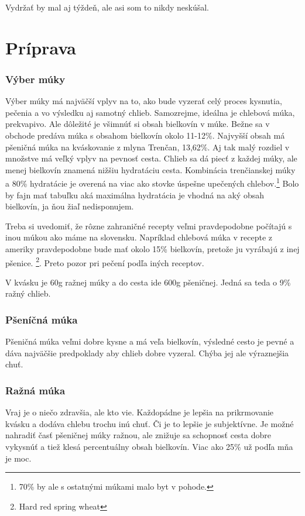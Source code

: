 \documentclass[a4paper,12pt]{article}
\begin{document}
Vydržať by mal aj týždeň, ale asi som to nikdy neskúšal.

\section{Príprava}

\subsubsection{Výber múky}
Výber múky má najväčší vplyv na to, ako bude vyzerať celý proces kysnutia, pečenia a vo výsledku aj samotný chlieb. Samozrejme, ideálna je chlebová múka, prekvapivo. Ale dôležité je všimnúť si obsah bielkovín v múke. Bežne sa v obchode predáva múka s obsahom bielkovín okolo 11-12\%. Najvyšší obsah má pšeničná múka na kváskovanie z mlyna Trenčan, 13,62\%. Aj tak malý rozdiel v množstve má veľký vplyv na pevnosť cesta. Chlieb sa dá piecť z každej múky, ale menej bielkovín znamená nižšiu hydratáciu cesta. Kombinácia trenčianskej múky a 80\% hydratácie je overená na viac ako stovke úspešne upečených chlebov.\footnote{70\% by ale s ostatnými múkami malo byt v pohode.} Bolo by fajn mať tabuľku aká maximálna hydratácia je vhodná na aký obsah bielkovín, ja ňou žiaľ nedisponujem.

Treba si uvedomiť, že rôzne zahraničné recepty veľmi pravdepodobne počítajú s inou múkou ako máme na slovensku. Napríklad chlebová múka v recepte z ameriky pravdepodobne bude mať okolo 15\% bielkovín, pretože ju vyrábajú z inej pšenice. \footnote{Hard red spring wheat}. Preto pozor pri pečení podľa iných receptov.

V kvásku je 60g ražnej múky a do cesta ide 600g pšeničnej. Jedná sa teda o 9\% ražný chlieb.


\subsubsection{Pšeníčná múka}
Pšeničná múka veľmi dobre kysne a má veľa bielkovín, výsledné cesto je pevné a dáva najväčšie predpoklady aby chlieb dobre vyzeral. Chýba jej ale výraznejšia chuť.
\subsubsection{Ražná múka}
Vraj je o niečo zdravšia, ale kto vie. Každopádne je lepšia na prikrmovanie kvásku a dodáva chlebu trochu inú chuť. Či je to lepšie je subjektívne. Je možné  nahradiť časť pšeničnej múky ražnou, ale znižuje sa schopnosť cesta dobre vykysnúť a tiež klesá percentuálny obsah bielkovín. Viac ako 25\% už podľa mňa je moc.
\end{document}
